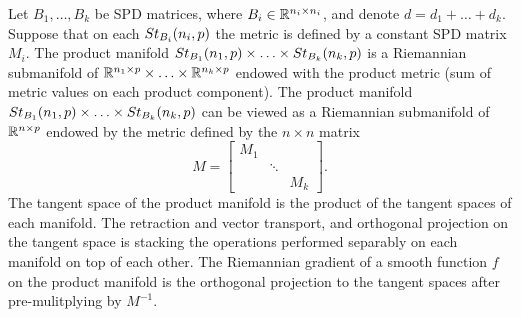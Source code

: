 \documentclass[11pt,a4paper]{article}
\begin{document}
\begin{prop}
Let $B_1,\ldots,B_k$ be SPD matrices, where $B_i\in\mathbb{R}^{n_i\times n_i}$, and denote $d = d_1+\ldots+d_k$. Suppose that on each $St_{B_{i}}(n_{i},p)$ the metric is defined by a constant SPD matrix $M_i$. The product manifold $St_{B_{1}}(n_{1},p)\times\ldots\times St_{B_{k}}(n_{k},p)$ is a Riemannian submanifold of $\mathbb{R}^{n_1\times p}\times\ldots\times\mathbb{R}^{n_k\times p}$ endowed with the product metric (sum of metric values on each product component). The product manifold $St_{B_{1}}(n_{1},p)\times\ldots\times St_{B_{k}}(n_{k},p)$ can be viewed as a Riemannian submanifold of $\mathbb{R}^{n\times p}$ endowed by the metric defined by the $n\times n$ matrix
\begin{equation*}
M = 
\left[\begin{array}{ccc}
M_1 & & \\
 & \ddots & \\
 & & M_k
\end{array}\right].
\end{equation*}
The tangent space of the product manifold is the product of the tangent spaces of each manifold. The retraction and vector transport, and orthogonal projection on the tangent space is stacking the operations performed separably on each manifold on top of each other. The Riemannian gradient of a smooth function $f$ on the product manifold is the orthogonal projection to the tangent spaces after pre-mulitplying by $M^{-1}$.
\end{prop}

\end{document}
